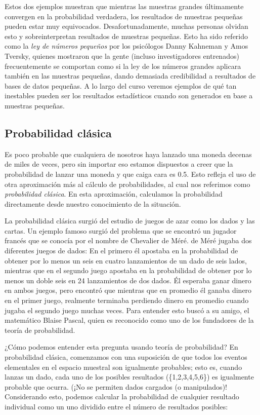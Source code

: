 \documentclass[
  12pt,
]{book}
\begin{document}
Estos dos ejemplos muestran que mientras las muestras grandes últimamente convergen en la probabilidad verdadera, los resultados de muestras pequeñas pueden estar muy equivocados. Desafortunadamente, muchas personas olvidan esto y sobreinterpretan resultados de muestras pequeñas. Esto ha sido referido como la \emph{ley de números pequeños} por los psicólogos Danny Kahneman y Amos Tversky, quienes mostraron que la gente (incluso investigadores entrenados) frecuentemente se comportan como si la ley de los números grandes aplicara también en las muestras pequeñas, dando demasiada credibilidad a resultados de bases de datos pequeñas. A lo largo del curso veremos ejemplos de qué tan inestables pueden ser los resultados estadísticos cuando son generados en base a muestras pequeñas.

\hypertarget{probabilidad-cluxe1sica}{%
\subsection{Probabilidad clásica}\label{probabilidad-cluxe1sica}}

Es poco probable que cualquiera de nosotros haya lanzado una moneda decenas de miles de veces, pero sin importar eso estamos dispuestos a creer que la probabilidad de lanzar una moneda y que caiga cara es 0.5. Esto refleja el uso de otra aproximación más al cálculo de probabilidades, al cual nos referimos como \emph{probabilidad clásica}. En esta aproximación, calculamos la probabilidad directamente desde nuestro conocimiento de la situación.

La probabilidad clásica surgió del estudio de juegos de azar como los dados y las cartas. Un ejemplo famoso surgió del problema que se encontró un jugador francés que se conocía por el nombre de Chevalier de Méré. de Méré jugaba dos diferentes juegos de dados: En el primero él apostaba en la probabilidad de obtener por lo menos un seis en cuatro lanzamientos de un dado de seis lados, mientras que en el segundo juego apostaba en la probabilidad de obtener por lo menos un doble seis en 24 lanzamientos de dos dados. Él esperaba ganar dinero en ambos juegos, pero encontró que mientras que en promedio él ganaba dinero en el primer juego, realmente terminaba perdiendo dinero en promedio cuando jugaba el segundo juego muchas veces. Para entender esto buscó a su amigo, el matemático Blaise Pascal, quien es reconocido como uno de los fundadores de la teoría de probabilidad.

¿Cómo podemos entender esta pregunta usando teoría de probabilidad? En probabilidad clásica, comenzamos con una suposición de que todos los eventos elementales en el espacio muestral son igualmente probables; esto es, cuando lanzas un dado, cada uno de los posibles resultados (\{1,2,3,4,5,6\}) es igualmente probable que ocurra. (¡No se permiten dados cargados (o manipulados)! Considerando esto, podemos calcular la probabilidad de cualquier resultado individual como un uno dividido entre el número de resultados posibles:
\end{document}
